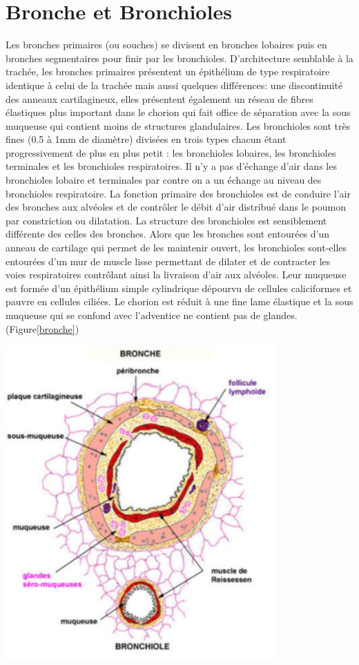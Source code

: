 		\section{Bronche et Bronchioles}
Les bronches primaires (ou souches) se divisent en bronches lobaires puis en bronches segmentaires pour finir par les bronchioles. D’architecture semblable à la trachée, les bronches primaires présentent un épithélium de type respiratoire identique à celui de la trachée mais aussi quelques différences: une discontinuité des anneaux cartilagineux, elles présentent également un réseau de fibres élastiques plus important dans le chorion qui fait office de séparation avec la sous muqueuse qui contient moins de structures glandulaires.
Les bronchioles sont très fines (0.5 à 1mm de diamètre) divisées en trois types chacun étant progressivement de plus en plus petit : les bronchioles lobaires, les bronchioles terminales et les bronchioles respiratoires. Il n’y a pas d’échange d’air dans les bronchioles lobaire et terminales par contre on a un échange au niveau des bronchioles respiratoire. La fonction primaire des bronchioles est de conduire l’air des bronches aux alvéoles et de contrôler le débit d’air distribué dans le poumon par constriction ou dilatation. La structure des bronchioles est sensiblement différente des celles des bronches. Alors que les bronches sont entourées d’un anneau de cartilage qui permet de les maintenir ouvert, les bronchioles sont-elles entourées d’un mur de muscle lisse permettant de dilater et de contracter les voies respiratoires contrôlant ainsi la livraison d’air aux alvéoles. Leur muqueuse est formée d’un épithélium simple cylindrique dépourvu de cellules caliciformes et pauvre en cellules ciliées. Le chorion est réduit à une fine lame élastique et la sous muqueuse qui se confond avec l’adventice ne contient pas de glandes. (Figure\ref{bronche})
\begin{center}
\includegraphics[scale=1.6]{gfx/bronche.jpg} 
       \label{bronche}
\end{center}


